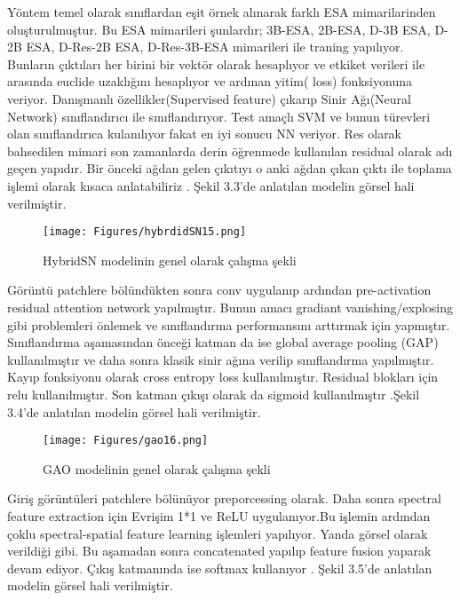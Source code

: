 \newpage
Yöntem temel olarak sınıflardan eşit örnek alınarak farklı ESA mimarilarinden oluşturulmuştur. Bu ESA mimarileri şunlardır; 3B-ESA, 2B-ESA,  D-3B ESA, D-2B ESA, D-Res-2B ESA, D-Res-3B-ESA mimarileri ile traning yapılıyor. Bunların çıktıları her birini bir vektör olarak hesaplıyor ve etkiket verileri ile arasında euclide uzaklığını hesaplıyor ve ardınan yitim( loss) fonksiyonuna veriyor. Danışmanlı özellikler(Supervised feature) çıkarıp Sinir Ağı(Neural Network) sınıflandırıcı ile sınıflandırıyor. Test amaçlı SVM ve bunun türevleri olan sınıflandırıca kulanılıyor fakat en iyi sonucu NN veriyor. Res olarak bahsedilen mimari son zamanlarda derin öğrenmede kullanılan residual olarak adı geçen yapıdır. Bir önceki ağdan gelen çıkıtıyı o anki ağdan çıkan çıktı ile toplama işlemi olarak kısaca anlatabiliriz \cite{roy2019hybridsn}. Şekil 3.3'de anlatılan modelin görsel hali verilmiştir. \\


\begin{figure}[!ht]
  \centering
  \texttt{[image: Figures/hybrdidSN15.png]}
  \caption{HybridSN modelinin genel olarak çalışma şekli }
\end{figure}

\newpage
Görüntü patchlere bölündükten sonra conv uygulanıp ardından pre-activation residual attention network yapılmıştır. Bunun amacı gradiant vanishing/explosing gibi problemleri önlemek ve sınıflandırma performansını arttırmak için yapmıştır. Sınıflandırma aşamasından önceği katman da ise global average pooling (GAP) kullanılmıştır ve daha sonra klasik sinir ağına verilip sınıflandırma yapılmıştır. Kayıp fonksiyonu olarak cross entropy loss kullanılmıştır. Residual blokları için relu kullanılmıştır. Son katman çıkışı olarak da sigmoid kullanılmıştır \cite{gao2019hyperspectral}.Şekil 3.4'de anlatılan modelin görsel hali verilmiştir. \\

\begin{figure}[!ht]
  \centering
  \texttt{[image: Figures/gao16.png]}
  \caption{GAO modelinin genel olarak çalışma şekli }
\end{figure}
\newpage
Giriş görüntüleri patchlere bölünüyor preporcessing olarak. Daha sonra spectral feature extraction için Evrişim 1*1 ve ReLU uygulanıyor.Bu işlemin ardından çoklu spectral-spatial feature learning işlemleri yapılıyor. Yanda görsel olarak verildiği gibi. Bu aşamadan sonra concatenated yapılıp feature fusion yaparak devam ediyor. Çıkış katmanında ise softmax kullanıyor \cite{bai2019ssdc}. Şekil 3.5'de anlatılan modelin görsel hali verilmiştir. \\


